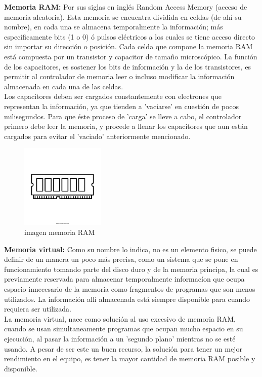 \documentclass{article}
\begin{document}
\textbf{Memoria RAM:} Por sus siglas en inglés Random Access Memory (acceso de memoria aleatoria). Esta memoria se encuentra dividida en celdas (de ahí su nombre), en cada una se almacena temporalmente la información; más específicamente bits (1 o 0) ó pulsos eléctricos a los cuales se tiene acceso directo sin importar su dirección o posición.
Cada celda que compone la memoria RAM está compuesta por un transistor y capacitor de tamaño microscópico.
La función de los capacitores, es sostener los bits de información y la de los transistores, es permitir al controlador de memoria leer o incluso modificar la información almacenada en cada una de las celdas.\\
\noindent
Los capacitores deben ser cargados constantemente con electrones que representan la información, ya que tienden a 'vaciarse' en cuestión de pocos milisegundos. Para que éste proceso de 'carga' se lleve a cabo, el controlador primero debe leer la memoria, y procede a llenar los capacitores que aun están cargados para evitar el 'vaciado' anteriormente mencionado.\\
%
\begin{figure}[h]
\includegraphics[width=4cm]{memoriaRAM.png}
\centering
\caption{imagen memoria RAM}
\label{fig:memoriaRAM}
\end{figure}

\textbf{Memoria virtual:} Como su nombre lo indica, no es un elemento fisico, se puede definir de un manera un poco más precisa, como un sistema que se pone en funcionamiento tomando parte del disco duro y de la memoria principa, la cual es previamente reservada para almacenar temporalmente informacíon que ocupa espacio innecesario de la memoria como fragmentos de programas que son menos utilizados. La información allí almacenada está siempre disponible para cuando requiera ser utilizada.\\

\noindent
La memoria virtual, nace como solución al uso excesivo de memoria RAM, cuando se usan simultaneamente programas que ocupan mucho espacio en su ejecución, al pasar la información a un 'segundo plano' mientras no se esté usando.
A pesar de ser este un buen recurso, la solución para tener un mejor rendimiento en el equipo, es tener la mayor cantidad de memoria RAM posible y disponible.\\
\end{document}

